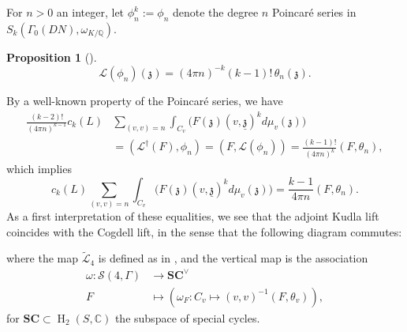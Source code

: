 \documentclass[12pt,a4paper,reqno]{amsart}
\theoremstyle{definition}
\numberwithin{definition}{subsection}
\theoremstyle{definition}
\numberwithin{Definition}{subsection}
\theoremstyle{remark}
\theoremstyle{remark}
\numberwithin{Remark}{subsection}
\theoremstyle{remark}
\theoremstyle{plain}
\numberwithin{Theorem}{subsection}
\theoremstyle{plain}
\theoremstyle{plain}
\theoremstyle{plain}
\theoremstyle{plain}
\theoremstyle{plain}
\theoremstyle{plain}
\newtheorem{Proposition}[Theorem]{Proposition}
\theoremstyle{plain}
\newcommand*{\Q}{\mathbb{Q}}
\newcommand*{\Cc}{\mathbb{C}}
\DeclareMathOperator{\h}{H}
\begin{document}
\noindent For $n>0$ an integer, let $\phi^k_n:=\phi_n$ denote the degree $n$ Poincaré series in $S_k(\Gamma_0(DN),\omega_{K/\Q})$.

\begin{Proposition}[]
\[
\mathcal{L}(\phi_n)(\mathfrak{z})=(4\pi n)^{-k}(k-1)!\,\theta_n(\mathfrak{z}).
\]
\end{Proposition}
\noindent By a well-known property of the Poincaré series, we have
\begin{align*}
\frac{(k-2)!}{(4\pi n)^{k-1}}c_k(L)&\sum_{(v,v)=n}\int_{C_v}\Big(F(\mathfrak{z})(v,\underline{\mathfrak{z}})^{k}d\mu_{v}(\mathfrak{z})\Big)\\&=(\mathcal{L}^\dagger(F), \phi_n)=(F,\mathcal{L}(\phi_n))=\frac{(k-1)!}{(4\pi n)^{k}}(F,\theta_n),
\end{align*}
which implies
\[
c_k(L)\sum_{(v,v)=n}\int_{C_v}\Big(F(\mathfrak{z})(v,\underline{\mathfrak{z}})^{k}d\mu_{v}(\mathfrak{z})\Big)=\frac{k-1}{4\pi n}(F,\theta_n).
\]
As a first interpretation of these equalities, we see that the adjoint Kudla lift coincides with the Cogdell lift, in the sense that the following diagram commutes:

\begin{center}
\end{center}

\noindent where the map $\tilde{\mathcal{L}}_4$ is defined as in  \cite[p. 497]{tongwang}, and the vertical map is the association
\begin{align*}
\omega:\mathscr{S}(4,\Gamma)&\to \textbf{SC}^\vee\\
F&\mapsto (\omega_F:C_v\mapsto (v,v)^{-1}(F,\theta_v)),
\end{align*}
for $\textbf{SC}\subset \h_2(S, \Cc)$ the subspace of special cycles.
\end{document}
